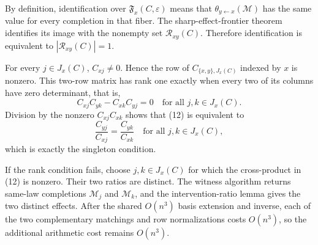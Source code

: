 By definition, identification over \(\mathfrak F_x(C,\varepsilon)\) means that \(\theta_{y\leftarrow x}(\mathcal M)\) has the same value for every completion in that fiber. The sharp-effect-frontier theorem identifies its image with the nonempty set \(\mathcal R_{xy}(C)\). Therefore identification is equivalent to \(|\mathcal R_{xy}(C)|=1\).

For every \(j\in J_x(C)\), \(C_{xj}\ne0\). Hence the row of \(C_{\{x,y\},J_x(C)}\) indexed by \(x\) is nonzero. This two-row matrix has rank one exactly when every two of its columns have zero determinant, that is,
\[
 C_{xj}C_{yk}-C_{xk}C_{yj}=0
 \quad\text{for all }j,k\in J_x(C). \tag{12}
\]
Division by the nonzero \(C_{xj}C_{xk}\) shows that (12) is equivalent to
\[
 \frac{C_{yj}}{C_{xj}}=\frac{C_{yk}}{C_{xk}}
 \quad\text{for all }j,k\in J_x(C),
\]
which is exactly the singleton condition.

If the rank condition fails, choose \(j,k\in J_x(C)\) for which the cross-product in (12) is nonzero. Their two ratios are distinct. The witness algorithm returns same-law completions \(\mathcal M_j\) and \(\mathcal M_k\), and the intervention-ratio lemma gives the two distinct effects. After the shared \(O(n^3)\) basis extension and inverse, each of the two complementary matchings and row normalizations costs \(O(n^3)\), so the additional arithmetic cost remains \(O(n^3)\).